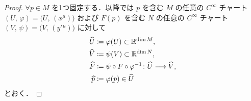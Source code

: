 \documentclass[TQFT_main]{subfiles}
\begin{document}
\begin{proof}
    $\forall p \in M$ を1つ固定する．以降では $p$ を含む $M$ の任意の $C^\infty$ チャート $(U,\, \varphi) = \bigl( U,\, (x^\mu) \bigr) $ および $F(p)$ を含む $N$ の任意の $C^\infty$ チャート $(V,\, \psi) = \bigl( V,\, (y'{}^\mu) \bigr) $ に対して
    \begin{align}
        \widehat{U} &\coloneqq \varphi(U) \subset \mathbb{R}^{\dim M}, \\
        \widehat{V} &\coloneqq \psi(V) \subset \mathbb{R}^{\dim N}, \\
        \widehat{F} &\coloneqq \psi \circ F \circ \varphi^{-1} \colon \widehat{U} \longrightarrow \widehat{V}, \\
        \widehat{p} &\coloneqq \varphi(p) \in \widehat{U}
    \end{align}
    とおく．
    

\end{proof}
\end{document}
